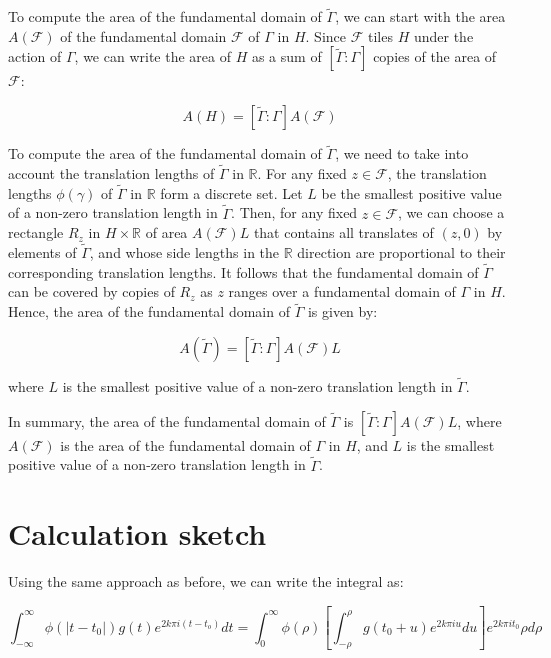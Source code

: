 \documentclass[12pt,a4paper,english]{article}
\theoremstyle{plain}
\theoremstyle{definition}
\theoremstyle{remark}
\begin{document}
To compute the area of the fundamental domain of $\tilde{\Gamma}$, we can start with the area $A(\mathcal{F})$ of the fundamental domain $\mathcal{F}$ of $\Gamma$ in $H$. Since $\mathcal{F}$ tiles $H$ under the action of $\Gamma$, we can write the area of $H$ as a sum of $[\tilde{\Gamma}:\Gamma]$ copies of the area of $\mathcal{F}$:

$$A(H) = [\tilde{\Gamma}:\Gamma] A(\mathcal{F})$$

To compute the area of the fundamental domain of $\tilde{\Gamma}$, we need to take into account the translation lengths of $\tilde{\Gamma}$ in $\mathbb{R}$. For any fixed $z \in \mathcal{F}$, the translation lengths $\phi(\gamma)$ of $\tilde{\Gamma}$ in $\mathbb{R}$ form a discrete set. Let $L$ be the smallest positive value of a non-zero translation length in $\tilde{\Gamma}$. Then, for any fixed $z \in \mathcal{F}$, we can choose a rectangle $R_z$ in $H \times \mathbb{R}$ of area $A(\mathcal{F}) L$ that contains all translates of $(z,0)$ by elements of $\tilde{\Gamma}$, and whose side lengths in the $\mathbb{R}$ direction are proportional to their corresponding translation lengths. It follows that the fundamental domain of $\tilde{\Gamma}$ can be covered by copies of $R_z$ as $z$ ranges over a fundamental domain of $\Gamma$ in $H$. Hence, the area of the fundamental domain of $\tilde{\Gamma}$ is given by:

$$A(\tilde{\Gamma}) = [\tilde{\Gamma}:\Gamma] A(\mathcal{F}) L$$

where $L$ is the smallest positive value of a non-zero translation length in $\tilde{\Gamma}$.

In summary, the area of the fundamental domain of $\tilde{\Gamma}$ is $[\tilde{\Gamma}:\Gamma] A(\mathcal{F}) L$, where $A(\mathcal{F})$ is the area of the fundamental domain of $\Gamma$ in $H$, and $L$ is the smallest positive value of a non-zero translation length in $\tilde{\Gamma}$.





\section{Calculation sketch}
Using the same approach as before, we can write the integral as:

$$\int_{-\infty}^{\infty} \phi(|t-t_{0}|)g(t)e^{2k\pi i(t-t_{o})}dt = \int_{0}^{\infty} \phi(\rho) \left[\int_{-\rho}^{\rho} g(t_{0} + u) e^{2k\pi iu} du\right] e^{2k\pi i t_{0}} \rho d\rho$$
\end{document}
